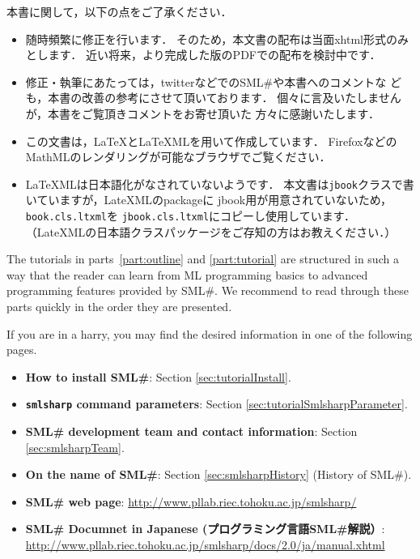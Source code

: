 \documentclass{jbook}
\newcommand{\smlsharp}{SML\#}
\newcommand{\documentUrlJa}{\url{http://www.pllab.riec.tohoku.ac.jp/smlsharp/docs/2.0/ja/manual.xhtml}}
\begin{document}
本書に関して，以下の点をご了承ください．
\begin{itemize}
\item 随時頻繁に修正を行います．
	そのため，本文書の配布は当面xhtml形式のみとします．
	近い将来，より完成した版のPDFでの配布を検討中です．
\item
	修正・執筆にあたっては，twitterなどでの\smlsharp{}や本書へのコメントな
ども，本書の改善の参考にさせて頂いております．
	個々に言及いたしませんが，本書をご覧頂きコメントをお寄せ頂いた
方々に感謝いたします． 

\item この文書は，LaTeXとLaTeXMLを用いて作成しています．
FirefoxなどのMathMLのレンダリングが可能なブラウザでご覧ください．

\item LaTeXMLは日本語化がなされていないようです．
	本文書は{\tt jbook}クラスで書いていますが，LateXMLのpackageに
jbook用が用意されていないため，{\tt book.cls.ltxml}を
{\tt jbook.cls.ltxml}にコピーし使用しています．
	（LateXMLの日本語クラスパッケージをご存知の方はお教えください．）
\end{itemize}
\else%

	The tutorials in parts~\ref{part:outline} and
\ref{part:tutorial} are structured in such a way that the reader can
learn from ML programming basics to advanced programming features
provided by \smlsharp{}.
	We recommend to read through these parts quickly in the order
they are presented.

	If you are in a harry, you may find the desired information in
one of the following pages.
\begin{itemize}
\item {\bf How to install \smlsharp{}}: Section \ref{sec:tutorialInstall}.
\item {\bf {\tt smlsharp} command parameters}: Section \ref{sec:tutorialSmlsharpParameter}.
\item {\bf \smlsharp{} development team and contact information}: 
Section \ref{sec:smlsharpTeam}.
\item {\bf On the name of \smlsharp{}}: Section \ref{sec:smlsharpHistory} (History of \smlsharp).
\item {\bf \smlsharp{} web page}: 
\url{http://www.pllab.riec.tohoku.ac.jp/smlsharp/}
\item {\bf \smlsharp{} Documnet in Japanese (プログラミング言語\smlsharp{}解説）}:
\documentUrlJa
\end{itemize}
\end{document}
